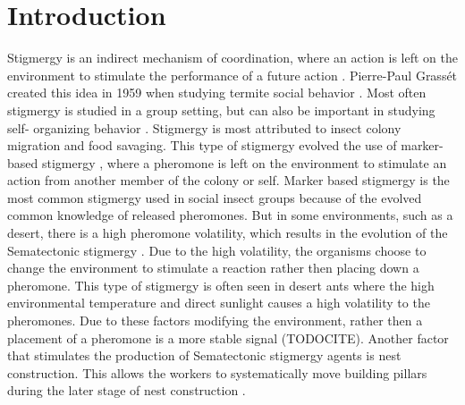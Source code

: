 \section{Introduction}

Stigmergy is an indirect mechanism of coordination, where an action is left on the environment to stimulate the performance of a future action \cite{susi_social_2001, ahadeli_multi-agent_2004}.
Pierre-Paul Grassét created this idea in 1959 when studying termite social behavior \cite{heylighen_stigmergy_2016a}.
Most often stigmergy is studied in a group setting, but can also be important in studying self- organizing behavior \cite{heylighen_stigmergy_2016b}.
Stigmergy is most attributed to insect colony migration and food savaging.
This type of stigmergy evolved the use of marker-based stigmergy \cite{ahadeli_multi-agent_2004, heylighen_stigmergy_2016b}, where a pheromone is left on the environment to stimulate an action from another member of the colony or self.
Marker based stigmergy is the most common stigmergy used in social insect groups because of the evolved common knowledge of released pheromones.
But in some environments, such as a desert, there is a high pheromone volatility, which results in the evolution of the Sematectonic stigmergy \cite{ahadeli_multi-agent_2004}.
Due to the high volatility, the organisms choose to change the environment to stimulate a reaction rather then placing down a pheromone.
This type of stigmergy is often seen in desert ants where the high environmental temperature and direct sunlight causes a high volatility to the pheromones.
Due to these factors modifying the environment, rather then a placement of a pheromone is a more stable signal (TODOCITE).
Another factor that stimulates the production of Sematectonic stigmergy agents is nest construction.
This allows the workers to systematically move building pillars during the later stage of nest construction \cite{dorigo_ant_2000, dorigo_ant_2000}.

